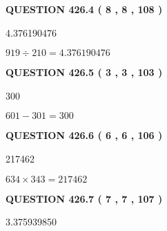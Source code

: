 \documentclass{ctexart}
\begin{document}
{\textbf{\Large{QUESTION
426.4 
 ( 8 , 8 , 108 )
}}}
  
  
 
 
\noindent{}

4.376190476
 
 
 
 
\noindent{}

$ %
919 \div  %
210=   %
4.376190476$
 
 
  
\vspace{0.2in}
  
{\textbf{\Large{QUESTION
426.5 
 ( 3 , 3 , 103 )
}}}
  
  
 
 
\noindent{}

300
 
 
 
 
\noindent{}

$ %
601 -  %
301=   %
300$
 
 
  
\vspace{0.2in}
  
{\textbf{\Large{QUESTION
426.6 
 ( 6 , 6 , 106 )
}}}
  
  
 
 
\noindent{}

217462
 
 
 
 
\noindent{}

$ %
634 \times  %
343=   %
217462$
 
 
  
\vspace{0.2in}
  
{\textbf{\Large{QUESTION
426.7 
 ( 7 , 7 , 107 )
}}}
  
  
 
 
\noindent{}

3.375939850
 
 
 
 
\noindent{}
\end{document}
